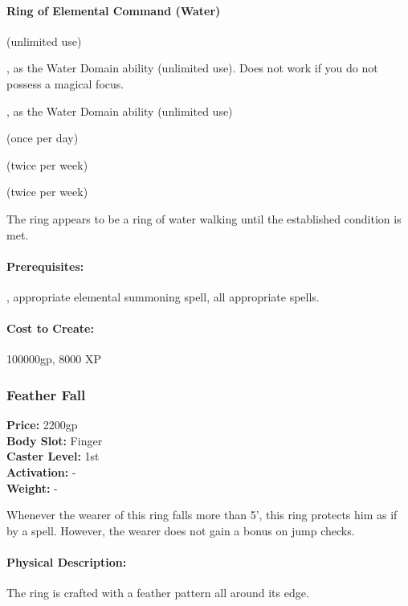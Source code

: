 \paragraph{Ring of Elemental Command (Water)}
\begin{list}{}{\leftmargin=1em}
\item {} (unlimited use)
\item {}, as the Water Domain ability (unlimited use). Does not work if you do not possess a magical focus.
\item {}, as the Water Domain ability (unlimited use)
\item {} (once per day)
\item {} (twice per week)
\item {} (twice per week)
\end{list}
The ring appears to be a ring of water walking until the established condition is met.

\paragraph{Prerequisites:} , appropriate elemental summoning spell, all appropriate spells.

\paragraph{Cost to Create:} 100000gp, 8000 XP
\subsubsection{Feather Fall}
\label{Item:FeatherFall}
   \textbf{Price:} 2200gp
\\ \textbf{Body Slot:} Finger
\\ \textbf{Caster Level:} 1st
\\ \textbf{Activation:} -
\\ \textbf{Weight:} -

Whenever the wearer of this ring falls more than 5', this ring protects him as if by a  spell. However, the wearer does not gain a bonus on jump checks.

\paragraph{Physical Description:} The ring is crafted with a feather pattern all around its edge.

